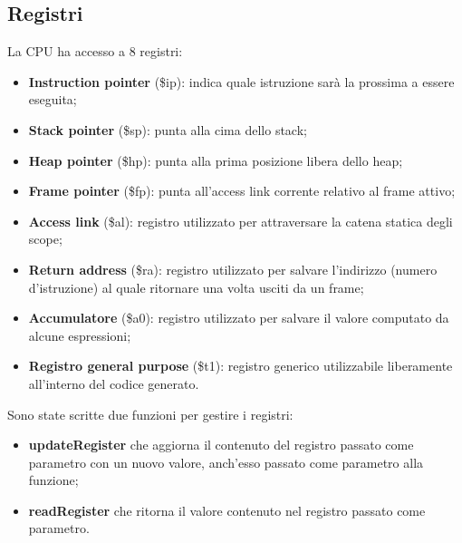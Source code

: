 \documentclass[../report.tex]{subfiles}
\begin{document}
\subsection{Registri}
La CPU ha accesso a 8 registri:
\begin{itemize}
    \item \textbf{Instruction pointer} (\$ip): indica quale istruzione sar\`a la prossima a essere eseguita;
    \item \textbf{Stack pointer} (\$sp): punta alla cima dello stack;
    \item \textbf{Heap pointer} (\$hp): punta alla prima posizione libera dello heap;
    \item \textbf{Frame pointer} (\$fp): punta all'access link corrente relativo al frame attivo;
    \item \textbf{Access link} (\$al): registro utilizzato per attraversare la catena statica degli scope;
    \item \textbf{Return address} (\$ra): registro utilizzato per salvare l'indirizzo (numero d'istruzione) al quale ritornare una volta usciti da un frame;
    \item \textbf{Accumulatore} (\$a0): registro utilizzato per salvare il valore computato da alcune espressioni;
    \item \textbf{Registro general purpose} (\$t1): registro generico utilizzabile liberamente all'interno del codice generato.
\end{itemize}
Sono state scritte due funzioni per gestire i registri:
\begin{itemize}
    \item \textbf{updateRegister} che aggiorna il contenuto del registro passato come parametro con un nuovo valore, anch'esso passato come parametro alla funzione;
    \item \textbf{readRegister} che ritorna il valore contenuto nel registro passato come parametro.
\end{itemize}
\end{document}
